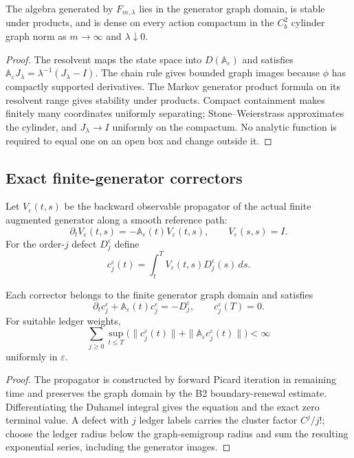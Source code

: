 \begin{lemma}
\label{lem:r8-b4-core}
The algebra generated by $F_{m,\lambda}$ lies in the generator graph domain,
is stable under products, and is dense on every action compactum in the
$C_b^2$ cylinder graph norm as $m\to\infty$ and $\lambda\downarrow0$.
\end{lemma}

\begin{proof}
The resolvent maps the state space into $D(\mathbb A_\varepsilon)$ and satisfies
$\mathbb A_\varepsilon J_\lambda=
\lambda^{-1}(J_\lambda-I)$.  The chain rule gives bounded graph images because
$\phi$ has compactly supported derivatives.  The Markov generator product
formula on its resolvent range gives stability under products.  Compact
containment makes finitely many coordinates uniformly separating; Stone--Weierstrass
approximates the cylinder, and $J_\lambda\to I$ uniformly on the compactum.
No analytic function is required to equal one on an open box and change
outside it.
\end{proof}

\subsection{Exact finite-generator correctors}

Let $V_\varepsilon(t,s)$ be the backward observable propagator of the actual
finite augmented generator along a smooth reference path:
\[
 \partial_tV_\varepsilon(t,s)
 =-\mathbb A_\varepsilon(t)V_\varepsilon(t,s),
 \qquad V_\varepsilon(s,s)=I.
\]
For the order-$j$ defect $D_j^\varepsilon$ define
\[
 c_j^\varepsilon(t)=\int_t^T
 V_\varepsilon(t,s)D_j^\varepsilon(s)\,ds.
\]

\begin{theorem}
\label{thm:r8-b4-corrector}
Each corrector belongs to the finite generator graph domain and satisfies
\[
 \partial_tc_j^\varepsilon+
 \mathbb A_\varepsilon(t)c_j^\varepsilon=-D_j^\varepsilon,
 \qquad c_j^\varepsilon(T)=0.
\]
For suitable ledger weights,
\[
 \sum_{j\ge0}\sup_{t\le T}
 \bigl(\|c_j^\varepsilon(t)\|+
 \|\mathbb A_\varepsilon c_j^\varepsilon(t)\|\bigr)<\infty
\]
uniformly in $\varepsilon$.
\end{theorem}

\begin{proof}
The propagator is constructed by forward Picard iteration in remaining time
and preserves the graph domain by the B2 boundary-renewal estimate.
Differentiating the Duhamel integral gives the equation and the exact zero
terminal value.  A defect with $j$ ledger labels carries the cluster factor
$C^j/j!$; choose the ledger radius below the graph-semigroup radius and sum the
resulting exponential series, including the generator images.
\end{proof}

